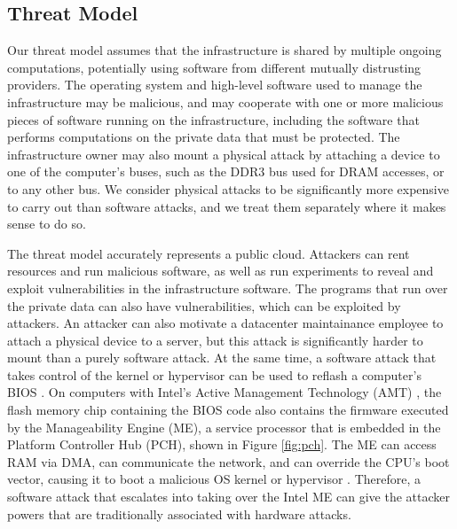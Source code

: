 \subsection{Threat Model}
\label{sec:threat}

Our threat model assumes that the infrastructure is shared by multiple ongoing
computations, potentially using software from different mutually distrusting
providers. The operating system and high-level software used to manage the
infrastructure may be malicious, and may cooperate with one or more malicious
pieces of software running on the infrastructure, including the software that
performs computations on the private data that must be protected. The
infrastructure owner may also mount a physical attack by attaching a device to
one of the computer's buses, such as the DDR3 bus used for DRAM accesses, or to
any other bus. We consider physical attacks to be significantly more expensive
to carry out than software attacks, and we treat them separately where it makes
sense to do so.

The threat model accurately represents a public cloud. Attackers can rent
resources and run malicious software, as well as run experiments to reveal and
exploit vulnerabilities in the infrastructure software. The programs that run
over the private data can also have vulnerabilities, which can be exploited by
attackers. An attacker can also motivate a datacenter maintainance employee to
attach a physical device to a server, but this attack is significantly harder
to mount than a purely software attack. At the same time, a software attack
that takes control of the kernel or hypervisor can be used to reflash a
computer's BIOS \cite{wojtczuk2010bios}. On computers with Intel's Active
Management Technology (AMT) \cite{intel2013amt}, the flash memory chip
containing the BIOS code also contains the firmware executed by the
Manageability Engine (ME), a service processor that is embedded in the
Platform Controller Hub (PCH), shown in Figure \ref{fig:pch}. The ME can access
RAM via DMA, can communicate the network, and can override the CPU's boot
vector, causing it to boot a malicious OS kernel or hypervisor
\cite{tereshkin2009amt}. Therefore, a software attack that escalates into
taking over the Intel ME can give the attacker powers that are traditionally
associated with hardware attacks.

